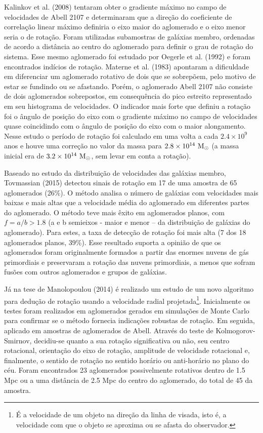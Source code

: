 \documentclass[12pt,fleqn]{article}
\begin{document}
{Kalinkov et al. (2008) tentaram obter o gradiente máximo no campo de velocidades de Abell 2107 e determinaram que a direção do coeficiente de correlação linear máximo definiria o eixo maior do aglomerado e o eixo menor seria o de rotação. Foram utilizadas subamostras de galáxias membro, ordenadas de acordo a distância ao centro do aglomerado para definir o grau de rotação do sistema. Esse mesmo aglomerado foi estudado por Oegerle et al. (1992) e foram encontrados indícios de rotação. Materne et al. (1983) apontaram a dificuldade em diferenciar um aglomerado rotativo de dois que se sobrepõem, pelo motivo de estar se fundindo ou se afastando. Porém, o aglomerado  Abell 2107 não consiste de dois aglomerados sobrepostos, em consequência do pico estreito representado em seu histograma de velocidades. O indicador mais forte que definiu a rotação foi o ângulo de posição do eixo com o gradiente máximo no campo de velocidades quase coincidindo com o ângulo de posição do eixo com o maior alongamento.  Nesse estudo o período de rotação foi calculado em uma volta a cada $2.4\times10^9$ anos e houve uma correção no valor da massa para $2.8\times10^{14}~{\rm M_\odot}$  (a massa inicial era de $3.2\times10^{14}~{\rm M_\odot}$, sem levar em conta a rotação). 

Baseado no estudo da distribuição de velocidades das galáxias membro, Tovmassian (2015)  detectou
sinais de rotação em 17 de uma amostra de 65 aglomerados (26\%).
O método analisa o número de galáxias com velocidades mais baixas e mais altas que a velocidade média do aglomerado em diferentes partes do aglomerado. O método teve mais êxito em aglomerados planos, com $f=a/b > 1.8$ (a e b semieixos - maior e menor – da distribuição de galáxias do aglomerado). 
Para estes, a taxa de detecção de rotação foi mais alta (7 dos 18 aglomerados planos, 39\%).  Esse resultado suporta a opinião de que os aglomerados foram originalmente formados a partir das enormes nuvens de gás primordiais e preservaram a rotação das nuvens primordiais, a menos que sofram fusões com outros aglomerados e grupos de galáxias. 

Já na tese de Manolopoulou (2014) é realizado um estudo de um novo algoritmo para dedução de rotação usando a velocidade radial projetada\footnote{É a velocidade de um objeto na direção da linha de visada, isto é, a velocidade com que o objeto se aproxima ou se afasta do observador.}. Inicialmente os testes foram realizados em aglomerados gerados em simulações de Monte Carlo para confirmar se o método fornecia indicações robustas de rotação. Em seguida, aplicado em amostras de aglomerados de Abell. Através do teste de Kolmogorov-Smirnov, decidiu-se quanto a sua rotação significativa ou não, seu centro rotacional, orientação do eixo de rotação, amplitude de velocidade rotacional e, finalmente, o sentido de rotação no sentido horário ou anti-horário no plano do céu. Foram encontrados 23 aglomerados possivelmente rotativos dentro de 1.5 Mpc ou a uma distância de 2.5 Mpc do centro do aglomerado, do total de 45 da amostra.


}
\end{document}
